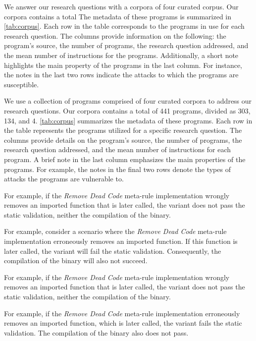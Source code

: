 We answer our research questions with a corpora of four curated corpus.
Our corpora contains a total 
The metadata of these programs is summarized in \autoref{tab:corpus}.
Each row in the table corresponds to the programs in use for each research question. 
The columns provide information on the following: the program's source, the number of programs, the research question addressed, and the mean number of instructions for the programs. 
Additionally, a short note highlights the main property of the programs in the last column. 
For instance, the notes in the last two rows indicate the attacks to which the programs are susceptible.

We use a collection of programs comprised of four curated corpora to address our research questions. 
Our corpora contains a total of 441 programs, divided as 303, 134, and 4. 
\autoref{tab:corpus} summarizes the metadata of these programs. 
Each row in the table represents the programs utilized for a specific research question. 
The columns provide details on the program's source, the number of programs, the research question addressed, and the mean number of instructions for each program. 
A brief note in the last column emphasizes the main properties of the programs. 
For example, the notes in the final two rows denote the types of attacks the programs are vulnerable to.


For example, if the \emph{Remove Dead Code} meta-rule implementation wrongly removes an imported function that is later called,  the variant does not pass the static validation, neither the compilation of the binary.

For example, consider a scenario where the \emph{Remove Dead Code} meta-rule implementation erroneously removes an imported function. If this function is later called, the variant will fail the static validation. Consequently, the compilation of the binary will also not succeed.

For example, if the \emph{Remove Dead Code} meta-rule implementation wrongly removes an imported function that is later called,  the variant does not pass the static validation, neither the compilation of the binary.

For example, if the \emph{Remove Dead Code} meta-rule implementation erroneously removes an imported function, which is later called, the variant fails the static validation. 
The compilation of the binary also does not pass.

